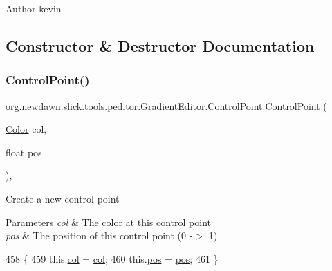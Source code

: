 \begin{DoxyAuthor}{Author}
kevin 
\end{DoxyAuthor}


\subsection{Constructor \& Destructor Documentation}
\mbox{\label{classorg_1_1newdawn_1_1slick_1_1tools_1_1peditor_1_1_gradient_editor_1_1_control_point_aee184ebed8c7a4191926a3c16b9268ef}} 
\subsubsection{\texorpdfstring{Control\+Point()}{ControlPoint()}}
{\footnotesize\ttfamily org.\+newdawn.\+slick.\+tools.\+peditor.\+Gradient\+Editor.\+Control\+Point.\+Control\+Point (\begin{DoxyParamCaption}\item[{\mbox{\hyperlink{classorg_1_1newdawn_1_1slick_1_1_color}{Color}}}]{col,  }\item[{float}]{pos }\end{DoxyParamCaption})\hspace{0.3cm}{\ttfamily [inline]}, {\ttfamily [private]}}

Create a new control point


\begin{DoxyParams}{Parameters}
{\em col} & The color at this control point \\
\hline
{\em pos} & The position of this control point (0 -\/$>$ 1) \\
\hline
\end{DoxyParams}

\begin{DoxyCode}
458                                                    \{
459             this.\mbox{\hyperlink{classorg_1_1newdawn_1_1slick_1_1tools_1_1peditor_1_1_gradient_editor_1_1_control_point_a330dad2b12917ff9c82aa59990bc3eaa}{col}} = \mbox{\hyperlink{classorg_1_1newdawn_1_1slick_1_1tools_1_1peditor_1_1_gradient_editor_1_1_control_point_a330dad2b12917ff9c82aa59990bc3eaa}{col}};
460             this.\mbox{\hyperlink{classorg_1_1newdawn_1_1slick_1_1tools_1_1peditor_1_1_gradient_editor_1_1_control_point_a2a1a00ff7fbc46c761def42eaf152fc2}{pos}} = \mbox{\hyperlink{classorg_1_1newdawn_1_1slick_1_1tools_1_1peditor_1_1_gradient_editor_1_1_control_point_a2a1a00ff7fbc46c761def42eaf152fc2}{pos}};
461         \}
\end{DoxyCode}


